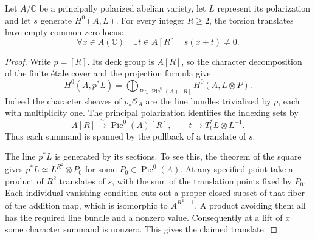 \begin{auxlemma}
\label{lem:eta-torsion-translate}
Let \(A/\mathbb C\) be a principally polarized abelian variety, let
\(L\) represent its polarization and let \(s\) generate \(H^0(A,L)\).
For every integer \(R\ge2\), the torsion translates have empty common zero locus:
\[
 \forall x\in A(\mathbb C)\quad\exists t\in A[R]\quad s(x+t)\ne0 .
\]
\end{auxlemma}
\begin{proof}
Write \(p=[R]\). Its deck group is \(A[R]\), so the character
decomposition of the finite étale cover and the projection formula give
\[
 H^0(A,p^*L)=
 \bigoplus_{P\in\operatorname{Pic}^0(A)[R]} H^0(A,L\otimes P).
\]
Indeed the character sheaves of \(p_*\mathcal O_A\) are the line
bundles trivialized by \(p\), each with multiplicity one. The
principal polarization identifies the indexing sets by
\[
 A[R]\xrightarrow{\ \sim\ }\operatorname{Pic}^0(A)[R],
 \qquad t\longmapsto T_t^*L\otimes L^{-1}.
\]
Thus each summand is spanned by the pullback of a translate of \(s\).

The line \(p^*L\) is generated by its sections. To see this, the
theorem of the square gives \(p^*L\simeq L^{R^2}\otimes P_0\) for
some \(P_0\in\operatorname{Pic}^0(A)\). At any specified point take
a product of \(R^2\) translates of \(s\), with the sum of the
translation points fixed by \(P_0\). Each individual vanishing
condition cuts out a proper closed subset of that fiber of the
addition map, which is isomorphic to \(A^{R^2-1}\). A product
avoiding them all has the required line bundle and a nonzero value.
Consequently at a lift of \(x\) some character summand is nonzero.
This gives the claimed translate.
\end{proof}

